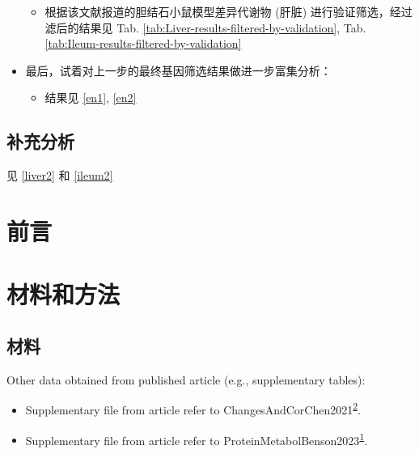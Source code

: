 \documentclass[
]{article}
\providecommand{\tightlist}{%
  \setlength{\itemsep}{0pt}\setlength{\parskip}{0pt}}
\begin{document}
\begin{itemize}
  \begin{itemize}
  \tightlist
  \item
    根据该文献报道的胆结石小鼠模型差异代谢物 (肝脏) 进行验证筛选，经过滤后的结果见 Tab. \ref{tab:Liver-results-filtered-by-validation}, Tab. \ref{tab:Ileum-results-filtered-by-validation}
  \end{itemize}
\item
  最后，试着对上一步的最终基因筛选结果做进一步富集分析：

  \begin{itemize}
  \tightlist
  \item
    结果见 \ref{en1}, \ref{en2}
  \end{itemize}
\end{itemize}

\hypertarget{ux8865ux5145ux5206ux6790}{%
\subsection{补充分析}\label{ux8865ux5145ux5206ux6790}}

见 \ref{liver2} 和 \ref{ileum2}

\hypertarget{introduction}{%
\section{前言}\label{introduction}}

\hypertarget{methods}{%
\section{材料和方法}\label{methods}}

\hypertarget{ux6750ux6599}{%
\subsection{材料}\label{ux6750ux6599}}

Other data obtained from published article (e.g., supplementary tables):

\begin{itemize}
\tightlist
\item
  Supplementary file from article refer to ChangesAndCorChen2021\textsuperscript{\protect\hyperlink{ref-ChangesAndCorChen2021}{2}}.
\item
  Supplementary file from article refer to ProteinMetabolBenson2023\textsuperscript{\protect\hyperlink{ref-ProteinMetabolBenson2023}{1}}.
\end{itemize}
\end{document}
